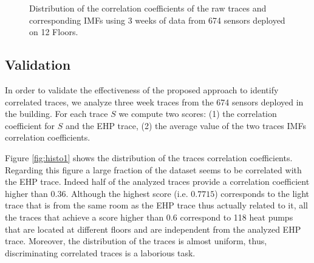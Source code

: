 \begin{figure}[tbh!]
\centering
 \caption{Distribution of the correlation coefficients of the raw traces and corresponding IMFs using 3 weeks of data from 674 sensors deployed on 12 Floors.}
\label{fig:histo}
\end{figure}

\subsection{Validation}


In order to validate the effectiveness of the proposed approach to identify correlated traces, we analyze three week traces from the 674 sensors deployed in the building.
For each trace $S$ we compute two scores: (1) the correlation coefficient for $S$ and the EHP trace, (2) the average value of the two traces IMFs correlation coefficients.

Figure \ref{fig:histo1} shows the distribution of the traces correlation coefficients.
Regarding this figure a large fraction of the dataset seems to be correlated with the EHP trace.
Indeed half of the analyzed traces provide a correlation coefficient higher than $0.36$.
Although the highest score (i.e. $0.7715$) corresponds to the light trace that is from the same room as the EHP trace thus actually related to it, all the traces that achieve a score higher than $0.6$  correspond to 118 heat pumps that are located at different floors and are independent from the analyzed EHP trace.
Moreover, the distribution of the traces is almost uniform, thus, discriminating correlated traces is a laborious task.

